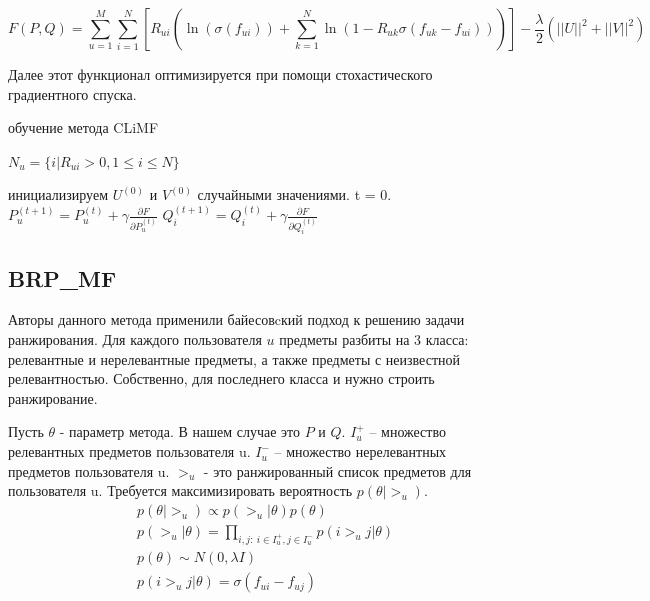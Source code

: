 \documentclass[14pt]{extarticle}
\begin{document}
\begin{equation*}
	F(P, Q) = \sum_{u=1}^M \sum_{i=1}^N [R_{ui}(\ln(\sigma(f_{ui})) + \sum_{k=1}^N \ln(1 - R_{uk}\sigma(f_{uk} - f_{ui})))] - \frac{\lambda}{2}({||U||}^2 + {||V||}^2 ) 
	\end{equation*}	

Далее этот функционал оптимизируется при помощи стохастического градиентного спуска.

\begin{algorithm}[h]
\caption{обучение метода CLiMF}
\begin{algorithmic}[1]
\State $N_u = \{i | R_{ui} > 0, 1 \leq i \leq N\}$
\EndFor

инициализируем $U^{(0)}$ и $V^{(0)}$ случайными значениями. t = 0.
\Repeat {} 
		\State $P_u^{(t+1)} = P_u^{(t)} + \gamma \frac{\partial F}{\partial P_u^{(t)}}$
				\State 	$Q_i^{(t+1)} = Q_i^{(t)} + \gamma \frac{\partial F}{\partial 	  																						Q_i^{(t)}}$		
			\EndFor	
	\EndFor 
{}

\end{algorithmic}
\label{alg:climf}
\end{algorithm}
\newpage
\subsection{BRP\_MF}  	

Авторы данного метода применили байесовcкий подход к решению задачи ранжирования. Для каждого пользователя $u$  предметы  разбиты на 3 класса: релевантные и нерелевантные предметы, а также предметы с неизвестной релевантностью. Собственно, для последнего класса и нужно  строить ранжирование. 



Пусть $\theta$ - параметр метода. В нашем случае это $P$ и $Q$.  $I_u^+$ -- множество релевантных предметов пользователя u. $I_u^-$ -- множество нерелевантных предметов пользователя u.  $>_u$ - это ранжированный список предметов для пользователя u. Требуется максимизировать вероятность $p(\theta|>_u)$.
\begin{equation*}
\begin{split}
	& p(\theta| >_u) \propto p(>_u| \theta)p(\theta) \\
	& p(>_u| \theta) = \prod_{i, j: \ i \in I_u^+, j \in I_u^-}p(i >_u j| \theta)\\
	& p(\theta) \sim N(0, \lambda I) \\
	& p(i >_u j| \theta) = \sigma(f_{ui} - f_{uj}) 
\end{split}
\end{equation*}
\end{document}
